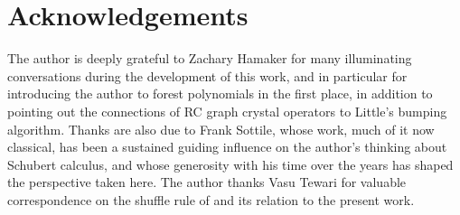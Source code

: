 \documentclass{amsart}
\theoremstyle{definition}
\theoremstyle{remark}
\numberwithin{equation}{subsection}
\begin{document}
\section*{Acknowledgements}

The author is deeply grateful to Zachary Hamaker for many illuminating conversations during the development of this work, and in particular for introducing the author to forest polynomials in the first place, in addition to pointing out the connections of RC graph crystal operators to  Little's bumping algorithm. Thanks are also due to Frank Sottile, whose work, much of it now classical, has been a sustained guiding influence on the author's thinking about Schubert calculus, and whose generosity with his time over the years has shaped the perspective taken here. The author thanks Vasu Tewari for valuable correspondence on the shuffle rule of \cite{nadeau2024forest} and its relation to the present work.



\end{document}
